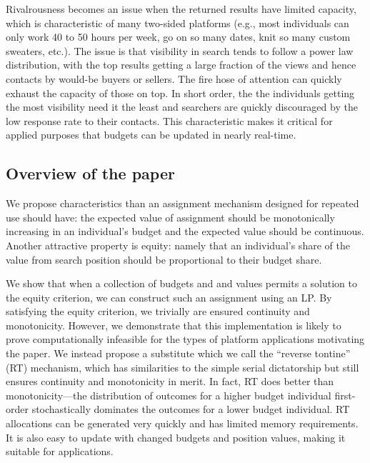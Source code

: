 \documentclass[prodmode,acmec]{acmsmall}
\begin{document}
Rivalrousness becomes an issue when the returned results have limited
capacity, which is characteristic of many two-sided platforms (e.g.,
most individuals can only work 40 to 50 hours per week, go on so many
dates, knit so many custom sweaters, etc.). The issue is that
visibility in search tends to follow a power law distribution, with
the top results getting a large fraction of the views and hence
contacts by would-be buyers or sellers. The fire hose of attention can
quickly exhaust the capacity of those on top. In short order, the the
individuals getting the most visibility need it the least and
searchers are quickly discouraged by the low response rate to their
contacts. This characteristic makes it critical for applied purposes
that budgets can be updated in nearly real-time.

\subsection{Overview of the paper} 
We propose characteristics than an assignment mechanism designed for
repeated use should have: the expected value of assignment should be
monotonically increasing in an individual's budget and the expected
value should be continuous. Another attractive property is equity:
namely that an individual's share of the value from search position
should be proportional to their budget share.

We show that when a collection of budgets and and values permits a
solution to the equity criterion, we can construct such an assignment
using an LP. By satisfying the equity criterion, we trivially are
ensured continuity and monotonicity. However, we demonstrate that this
implementation is likely to prove computationally infeasible for the
types of platform applications motivating the paper. We instead
propose a substitute which we call the ``reverse tontine'' (RT)
mechanism, which has similarities to the simple serial dictatorship
but still ensures continuity and monotonicity in merit. In fact, RT
does better than monotonicity---the distribution of outcomes for a
higher budget individual first-order stochastically dominates the
outcomes for a lower budget individual. RT allocations can be
generated very quickly and has limited memory requirements. It is also
easy to update with changed budgets and position values, making it
suitable for applications.
 
\end{document}
